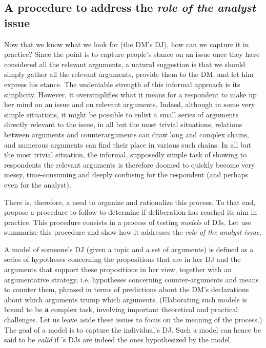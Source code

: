 \documentclass[a4paper, 11pt]{article}
\begin{document}
\subsection{A procedure to address the \emph{role of the analyst} issue}
Now that we know what we look for (the \ac{DM}'s \ac{DJ}), how can we capture it in practice? Since the point is to capture people’s stance on an issue once they have considered all the relevant arguments, a natural suggestion is that we should simply gather all the relevant arguments, provide them to the \ac{DM}, and let him express his stance. The undeniable strength of this informal approach is its simplicity. However, it oversimplifies what it means for a respondent to make up her mind on an issue and on relevant arguments. Indeed, although in some very simple situations, it might be possible to enlist a small series of arguments directly relevant to the issue, in all but the most trivial situations, relations between arguments and counterarguments can draw long and complex chains, and numerous arguments can find their place in various such chains. In all but the most trivial situation, the informal, supposedly simple task of showing to respondents the relevant arguments is therefore doomed to quickly become very messy, time-consuming and deeply confusing for the respondent (and perhaps even for the analyst).

There is, therefore, a need to organize and rationalize this process. To that end,  propose a procedure to follow to determine if deliberation has reached its aim in practice. This procedure consists in a process of testing \emph{models} of \acp{DJ}. Let use summarize this procedure and show how it addresses the \emph{role of the analyst issue}.

A model of someone’s \ac{DJ} (given a topic and a set of arguments) is defined as a series of hypotheses concerning the propositions that are in her \ac{DJ} and the arguments that support these propositions in her view, together with an argumentative strategy, i.e. hypotheses concerning counter-arguments and means to counter them, phrased in terms of predictions about the \ac{DM}’s declarations about which arguments trump which arguments. (Elaborating such models is bound to be \textbf{a} complex task, involving important theoretical and practical challenges. Let us leave aside these issues to focus on the meaning of the process.) The goal of a model is to capture the individual’s \ac{DJ}. Such a model can hence be said to be \emph{valid} if \thedm’s \acp{DJ} are indeed the ones hypothesized by the model.
\end{document}
